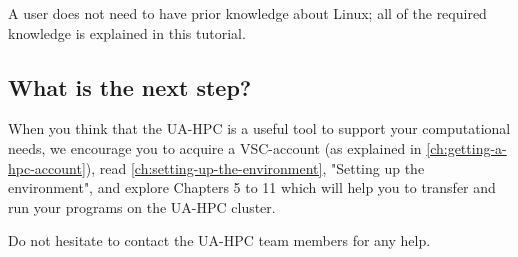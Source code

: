 A user does not need to have prior knowledge about Linux; all of the required
knowledge is explained in this tutorial.

\subsection{What is the next step?}
\label{sec:what-is-the-next-step}

When you think that the UA-HPC is a useful tool to support your computational
needs, we encourage you to acquire a VSC-account (as explained in
\autoref{ch:getting-a-hpc-account}), read \autoref{ch:setting-up-the-environment}, "Setting up the
environment", and explore Chapters 5 to 11 which will help you to transfer and
run your programs on the UA-HPC cluster.

Do not hesitate to contact the UA-HPC team members for any help.
